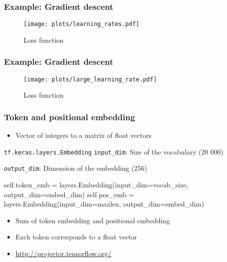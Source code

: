\documentclass[17pt,institute=e10]{tuhh_presentation}
\begin{document}
\begin{frame}[fragile]
  \frametitle{Example: Gradient descent}
    \vspace{-1cm}
    \begin{figure}
      \centering
      \texttt{[image: plots/learning\_rates.pdf]}
      \caption{Loss function}
    \end{figure}
\end{frame}

\begin{frame}[fragile]
  \frametitle{Example: Gradient descent}
    \vspace{-1cm}
    \begin{figure}
      \centering
      \texttt{[image: plots/large\_learning\_rate.pdf]}
      \caption{Loss function}
    \end{figure}
\end{frame}
\begin{frame}[fragile]
  \frametitle{Token and positional embedding}
  \begin{itemize}
    \item Vector of integers to a matrix of float vectors
  \end{itemize}

  \vspace{1cm}

  \begin{block}{\texttt{tf.keras.layers.Embedding}}
  \texttt{input\_dim}:  \;Size of the vocabulary (20 000)

  \texttt{output\_dim}:  Dimension of the embedding (256)

  \end{block}
  \pause

  \vspace{1cm}

\begin{python}
self.token_emb = layers.Embedding(input_dim=vocab_size, output_dim=embed_dim)
self.pos_emb   = layers.Embedding(input_dim=maxlen,     output_dim=embed_dim)
\end{python}

\vspace{1cm}

  \begin{itemize}
    \item Sum of token embedding and positional embedding
    \item Each token corresponds to a float vector
    \item \url{http://projector.tensorflow.org/}
  \end{itemize}
\end{frame}
\end{document}
